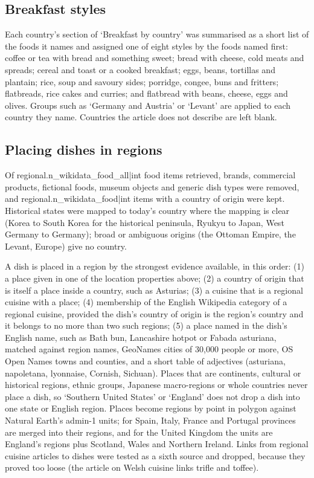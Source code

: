 \documentclass[11pt,a4paper]{article}
\begin{document}
\subsection{Breakfast styles}
Each country's section of `Breakfast by country' was summarised as a short list of the foods it names and assigned one of eight styles by the foods named first: coffee or tea with bread and something sweet; bread with cheese, cold meats and spreads; cereal and toast or a cooked breakfast; eggs, beans, tortillas and plantain; rice, soup and savoury sides; porridge, congee, buns and fritters; flatbreads, rice cakes and curries; and flatbread with beans, cheese, eggs and olives. Groups such as `Germany and Austria' or `Levant' are applied to each country they name. Countries the article does not describe are left blank.

\subsection{Placing dishes in regions}
Of {{regional.n_wikidata_food_all|int}} food items retrieved, brands, commercial products, fictional foods, museum objects and generic dish types were removed, and {{regional.n_wikidata_food|int}} items with a country of origin were kept. Historical states were mapped to today's country where the mapping is clear (Korea to South Korea for the historical peninsula, Ryukyu to Japan, West Germany to Germany); broad or ambiguous origins (the Ottoman Empire, the Levant, Europe) give no country.

A dish is placed in a region by the strongest evidence available, in this order: (1) a place given in one of the location properties above; (2) a country of origin that is itself a place inside a country, such as Asturias; (3) a cuisine that is a regional cuisine with a place; (4) membership of the English Wikipedia category of a regional cuisine, provided the dish's country of origin is the region's country and it belongs to no more than two such regions; (5) a place named in the dish's English name, such as Bath bun, Lancashire hotpot or Fabada asturiana, matched against region names, GeoNames cities of 30,000 people or more, OS Open Names towns and counties, and a short table of adjectives (asturiana, napoletana, lyonnaise, Cornish, Sichuan). Places that are continents, cultural or historical regions, ethnic groups, Japanese macro-regions or whole countries never place a dish, so `Southern United States' or `England' does not drop a dish into one state or English region. Places become regions by point in polygon against Natural Earth's admin-1 units; for Spain, Italy, France and Portugal provinces are merged into their regions, and for the United Kingdom the units are England's regions plus Scotland, Wales and Northern Ireland. Links from regional cuisine articles to dishes were tested as a sixth source and dropped, because they proved too loose (the article on Welsh cuisine links trifle and toffee).
\end{document}
